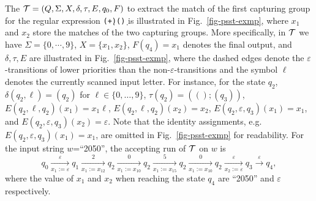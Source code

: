 \begin{example}
The {\PSST} $\mathcal{T}=(Q, \Sigma, X, \delta, \tau, E,  q_{0}, F)$ to extract the match of the first capturing group for the regular expression \texttt{(\d+)(\d*)} 
%
is illustrated in Fig.~\ref{fig-psst-exmp}, where $x_1$ and $x_2$ store the matches of the two capturing groups. More specifically, in $\mathcal{T}$ we have $\Sigma = \{0,\cdots,9\}$, $X= \{x_1,x_2\}$, $F(q_{4}) = x_1$ denotes the final output, and $\delta, \tau, E$ are illustrated %
in Fig.~\ref{fig-psst-exmp}, where the dashed edges denote the $\varepsilon$-transitions of lower priorities than the non-$\varepsilon$-transitions and the symbol $\ell$ denotes the currently scanned input letter. For instance, for the state $q_2$, $\delta(q_2, \ell) = (q_2)$ for $\ell \in \{0,\ldots, 9\}$, $\tau(q_2) = (();(q_3))$, $E(q_2, \ell, q_2)(x_1) = x_1 \ell$, $E(q_2, \ell, q_2)(x_2) = x_2$,  $E(q_2, \varepsilon, q_3)(x_1) = x_1$, and $E(q_2, \varepsilon, q_3)(x_2) = \varepsilon$. Note that the identity assignments, e.g. $E(q_2, \varepsilon, q_3)(x_1) = x_1$, are omitted in Fig.~\ref{fig-psst-exmp} for readability.  For the input string $w$=``2050'', the accepting run of $\mathcal{T}$ on $w$ %
is 
\[
q_0 \xrightarrow[x_1:=\varepsilon]{\varepsilon} q_1 \xrightarrow[x_1:=x_12]{2} q_2  \xrightarrow[x_1:=x_10]{0} q_2  \xrightarrow[x_1:=x_15]{5} q_2  \xrightarrow[x_1:=x_10]{0} q_2  \xrightarrow[x_2:=\varepsilon]{\varepsilon} q_3  \xrightarrow{\varepsilon} q_4,
\]
where the value of $x_1$ and $x_2$ when reaching the state $q_4$ are ``2050'' and $\varepsilon$ respectively. 


\end{example}
